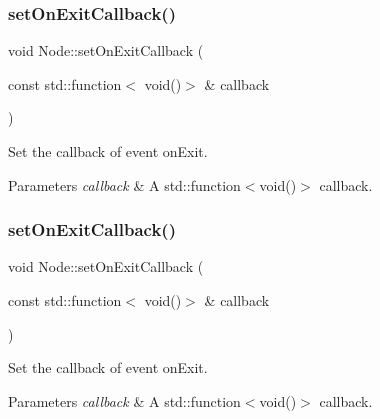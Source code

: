 \subsubsection{\texorpdfstring{set\+On\+Exit\+Callback()}{setOnExitCallback()}\hspace{0.1cm}{\footnotesize\ttfamily [1/2]}}
{\footnotesize\ttfamily void Node\+::set\+On\+Exit\+Callback (\begin{DoxyParamCaption}\item[{const std\+::function$<$ void()$>$ \&}]{callback }\end{DoxyParamCaption})\hspace{0.3cm}{\ttfamily [inline]}}

Set the callback of event on\+Exit. 
\begin{DoxyParams}{Parameters}
{\em callback} & A std\+::function$<$void()$>$ callback. \\
\hline
\end{DoxyParams}
\mbox{\label{classNode_a82e2254c47969bfa81be037230738367}} 
\subsubsection{\texorpdfstring{set\+On\+Exit\+Callback()}{setOnExitCallback()}\hspace{0.1cm}{\footnotesize\ttfamily [2/2]}}
{\footnotesize\ttfamily void Node\+::set\+On\+Exit\+Callback (\begin{DoxyParamCaption}\item[{const std\+::function$<$ void()$>$ \&}]{callback }\end{DoxyParamCaption})\hspace{0.3cm}{\ttfamily [inline]}}

Set the callback of event on\+Exit. 
\begin{DoxyParams}{Parameters}
{\em callback} & A std\+::function$<$void()$>$ callback. \\
\hline
\end{DoxyParams}
\mbox{\label{classNode_aca0270c92c148c57b0605aae8298e356}} 
